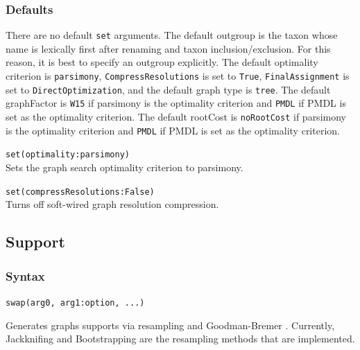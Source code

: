 	\subsubsection{Defaults} 
		There are no default \texttt{set} arguments. The default outgroup is the taxon whose name is 
		lexically first after renaming and taxon inclusion/exclusion. For this reason, it is best to specify 
		an outgroup explicitly. The default optimality criterion is \texttt{parsimony}, \texttt{CompressResolutions} 
		is set to \texttt{True}, \texttt{FinalAssignment} is set to \texttt{DirectOptimization}, and the default 
		graph type is \texttt{tree}. The default graphFactor is \texttt{W15} if parsimony is the optimality 
		criterion and \texttt{PMDL} if PMDL is set as the optimality criterion. The default rootCost
		is \texttt{noRootCost} if parsimony is the optimality criterion and \texttt{PMDL} if PMDL is set 
		as the optimality criterion.
		
	\begin{example}
		\item{\texttt{set(optimality:parsimony)}\\Sets the graph search optimality criterion to parsimony.}
						
		\item{\texttt{set(compressResolutions:False)}\\Turns off soft-wired graph resolution compression.}
	\end{example}

\subsection{Support}
	\subsubsection{Syntax}
		\texttt{swap(arg0, arg1:option, ...)}
		
	\begin{phygdescription}
		{Generates graphs supports via resampling \citep{Farrisetal1996} and Goodman-Bremer 
		\citep{Goodmanetal1982, bremer1994}. Currently, Jackknifing and Bootstrapping 
		are the resampling methods that are implemented.}
	\end{phygdescription}
		
